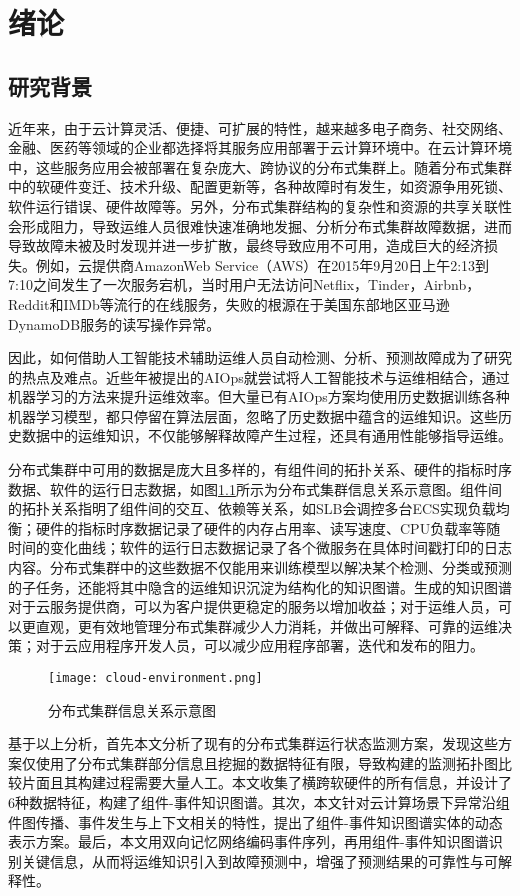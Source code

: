 \chapter{绪论}
\section{研究背景}
近年来，由于云计算灵活、便捷、可扩展的特性，越来越多电子商务、社交网络、金融、医药等领域的企业都选择将其服务应用部署于云计算环境中。在云计算环境中，这些服务应用会被部署在复杂庞大、跨协议的分布式集群上。随着分布式集群中的软硬件变迁、技术升级、配置更新等，各种故障时有发生，如资源争用死锁、软件运行错误、硬件故障等。另外，分布式集群结构的复杂性和资源的共享关联性会形成阻力，导致运维人员很难快速准确地发掘、分析分布式集群故障数据，进而导致故障未被及时发现并进一步扩散，最终导致应用不可用，造成巨大的经济损失。例如，云提供商AmazonWeb Service（AWS）在2015年9月20日上午2:13到7:10之间发生了一次服务宕机，当时用户无法访问Netflix，Tinder，Airbnb，Reddit和IMDb等流行的在线服务，失败的根源在于美国东部地区亚马逊DynamoDB服务的读写操作异常。

因此，如何借助人工智能技术辅助运维人员自动检测、分析、预测故障成为了研究的热点及难点。近些年被提出的AIOps就尝试将人工智能技术与运维相结合，通过机器学习的方法来提升运维效率。但大量已有AIOps方案均使用历史数据训练各种机器学习模型，都只停留在算法层面，忽略了历史数据中蕴含的运维知识。这些历史数据中的运维知识，不仅能够解释故障产生过程，还具有通用性能够指导运维。

分布式集群中可用的数据是庞大且多样的，有组件间的拓扑关系、硬件的指标时序数据、软件的运行日志数据，如图\ref{cloud-environment}所示为分布式集群信息关系示意图。组件间的拓扑关系指明了组件间的交互、依赖等关系，如SLB会调控多台ECS实现负载均衡；硬件的指标时序数据记录了硬件的内存占用率、读写速度、CPU负载率等随时间的变化曲线；软件的运行日志数据记录了各个微服务在具体时间戳打印的日志内容。分布式集群中的这些数据不仅能用来训练模型以解决某个检测、分类或预测的子任务，还能将其中隐含的运维知识沉淀为结构化的知识图谱。生成的知识图谱对于云服务提供商，可以为客户提供更稳定的服务以增加收益；对于运维人员，可以更直观，更有效地管理分布式集群减少人力消耗，并做出可解释、可靠的运维决策；对于云应用程序开发人员，可以减少应用程序部署，迭代和发布的阻力。
\begin{figure}[htbp]
    \centering
    \texttt{[image: cloud-environment.png]}
    \caption{分布式集群信息关系示意图\label{cloud-environment}}
\end{figure}

基于以上分析，首先本文分析了现有的分布式集群运行状态监测方案，发现这些方案仅使用了分布式集群部分信息且挖掘的数据特征有限，导致构建的监测拓扑图比较片面且其构建过程需要大量人工。本文收集了横跨软硬件的所有信息，并设计了6种数据特征，构建了组件-事件知识图谱。其次，本文针对云计算场景下异常沿组件图传播、事件发生与上下文相关的特性，提出了组件-事件知识图谱实体的动态表示方案。最后，本文用双向记忆网络编码事件序列，再用组件-事件知识图谱识别关键信息，从而将运维知识引入到故障预测中，增强了预测结果的可靠性与可解释性。

